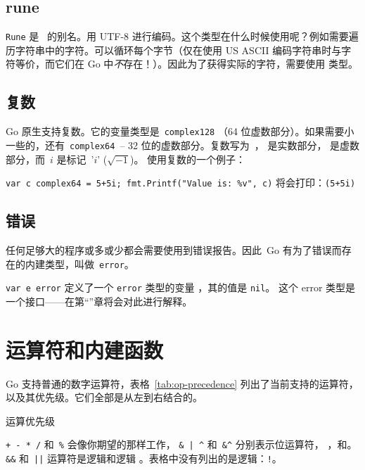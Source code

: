\subsection{rune}
\lstinline{Rune} 是~ 的别名。用 UTF-8 进行编码。这个类型在什么时候使用呢？例如需要遍历字符串中的字符。可以循环每个字节（仅在使用 US ASCII 编码字符串时与字符等价，而它们在 Go 中\emph{不}存在！）。因此为了获得实际的字符，需要使用  类型。

\subsection{复数}
Go 原生支持复数。它的变量类型是~\lstinline{complex128}
（64 位虚数部分）。如果需要小一些的，还有~\lstinline{complex64}~-- 
32 位的虚数部分。复数写为~， 是实数部分，
 是虚数部分，而~$i$ 是标记~'$i$' ($\sqrt{-1}$)。
使用复数的一个例子：

\lstinline{var c complex64 = 5+5i; fmt.Printf("Value is: %v", c)}\newline
将会打印：\lstinline{(5+5i)}

\subsection{错误}
任何足够大的程序或多或少都会需要使用到错误报告。因此~Go 有为了错误而存在的内建类型，叫做~\lstinline{error}。

\lstinline{var e error} 定义了一个 \lstinline{error} 类型的变量 ，其的值是 \lstinline{nil}。
这个 error 类型是一个接口——在第``''章将会对此进行解释。

\section{运算符和内建函数}
\label{sec:builtins}
Go 支持普通的数字运算符，表格~\ref{tab:op-precedence} 列出了当前支持的运算符，
以及其优先级。它们全部是从左到右结合的。

\begin{table}[H]
\begin{center}
\caption{运算优先级}
\label{tab:op-precedence}

\end{center}
\end{table}
\verb|+ - * /| 和~\verb|%| 会像你期望的那样工作，
\verb!& | ^! 和~\verb!&^! 分别表示位运算符，
，和。
\verb|&&| 和~\verb/||/ 运算符是逻辑和逻辑
。表格中没有列出的是逻辑：\verb/!/。

